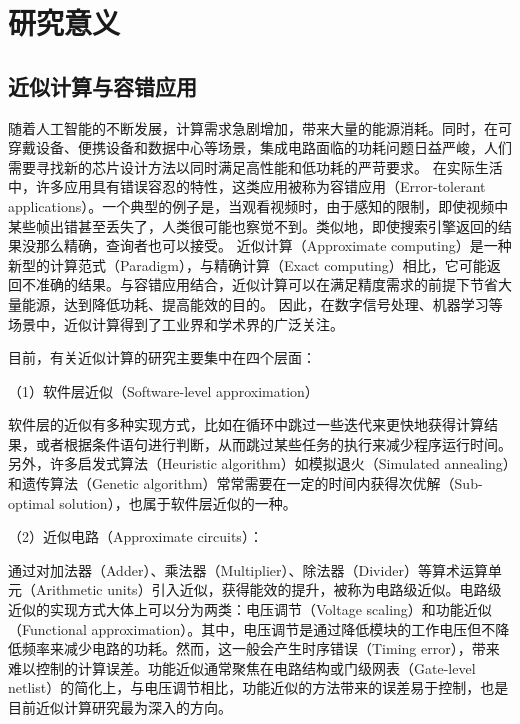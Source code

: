 \section{研究意义}

\subsection{近似计算与容错应用} \label{approximate_computing_advance}

随着人工智能的不断发展，计算需求急剧增加，带来大量的能源消耗。同时，在可穿戴设备、便携设备和数据中心等场景，集成电路面临的功耗问题日益严峻，人们需要寻找新的芯片设计方法以同时满足高性能和低功耗的严苛要求。
在实际生活中，许多应用具有错误容忍的特性，这类应用被称为容错应用（Error-tolerant applications）。一个典型的例子是，当观看视频时，由于感知的限制，即使视频中某些帧出错甚至丢失了，人类很可能也察觉不到。类似地，即使搜索引擎返回的结果没那么精确，查询者也可以接受。
近似计算（Approximate computing）是一种新型的计算范式（Paradigm），与精确计算（Exact computing）相比，它可能返回不准确的结果。与容错应用结合，近似计算可以在满足精度需求的前提下节省大量能源，达到降低功耗、提高能效的目的。
因此，在数字信号处理、机器学习等场景中，近似计算得到了工业界和学术界的广泛关注\cite{AC:survey:survey's_survey,AC:survey:hanjie_2013_ETS}。

目前，有关近似计算的研究主要集中在四个层面：

（1）软件层近似（Software-level approximation）

软件层的近似有多种实现方式，比如在循环中跳过一些迭代来更快地获得计算结果，或者根据条件语句进行判断，从而跳过某些任务的执行来减少程序运行时间。另外，许多启发式算法（Heuristic algorithm）如模拟退火（Simulated annealing）和遗传算法（Genetic algorithm）常常需要在一定的时间内获得次优解（Sub-optimal solution），也属于软件层近似的一种。

（2）近似电路（Approximate circuits）：

通过对加法器（Adder）\cite{AC:Aadd:simple_yet}、乘法器（Multiplier）\cite{AC:AM:Adapt}、除法器（Divider）\cite{AC:Div:2019dac}等算术运算单元（Arithmetic units）引入近似，获得能效的提升，被称为电路级近似。电路级近似的实现方式大体上可以分为两类：电压调节（Voltage scaling）和功能近似（Functional approximation）\cite{AC:ALS:survey}。其中，电压调节是通过降低模块的工作电压但不降低频率来减少电路的功耗。然而，这一般会产生时序错误（Timing error），带来难以控制的计算误差\cite{AC:Arith:overscale}。功能近似通常聚焦在电路结构或门级网表（Gate-level netlist）的简化上，与电压调节相比，功能近似的方法带来的误差易于控制，也是目前近似计算研究最为深入的方向\cite{AC:Arith:survey_hanjie}。

